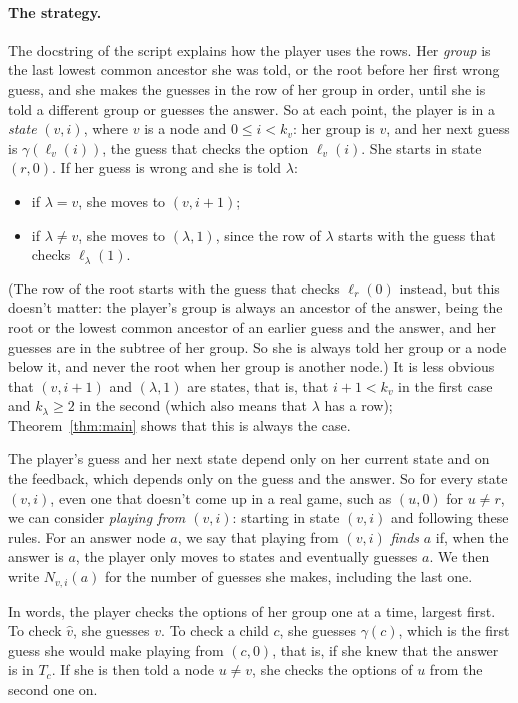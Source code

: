 \documentclass[11pt]{article}
\begin{document}
\paragraph{The strategy.}
The docstring of the script explains how the player uses the rows. Her
\emph{group} is the last lowest common ancestor she was told, or the root before
her first wrong guess, and she makes the guesses in the row of her group in
order, until she is told a different group or guesses the answer. So at each
point, the player is in a \emph{state} $(v, i)$, where $v$ is a node and
$0 \le i < k_v$: her group is $v$, and her next guess is $\gamma(\ell_v(i))$, the
guess that checks the option $\ell_v(i)$. She starts in state $(r, 0)$. If her
guess is wrong and she is told $\lambda$:
\begin{itemize}
  \item if $\lambda = v$, she moves to $(v, i + 1)$;
  \item if $\lambda \ne v$, she moves to $(\lambda, 1)$, since the row of
    $\lambda$ starts with the guess that checks $\ell_\lambda(1)$.
\end{itemize}
(The row of the root starts with the guess that checks $\ell_r(0)$ instead, but
this doesn't matter: the player's group is always an ancestor of the answer,
being the root or the lowest common ancestor of an earlier guess and the answer,
and her guesses are in the subtree of her group. So she is always told her group
or a node below it, and never the root when her group is another node.) It is
less obvious that $(v, i + 1)$ and $(\lambda, 1)$ are states, that is, that
$i + 1 < k_v$ in the first case and $k_\lambda \ge 2$ in the second (which also
means that $\lambda$ has a row); Theorem~\ref{thm:main} shows that this is always
the case.

The player's guess and her next state depend only on her current state and on the
feedback, which depends only on the guess and the answer. So for every state
$(v, i)$, even one that doesn't come up in a real game, such as $(u, 0)$ for
$u \ne r$, we can consider \emph{playing from $(v, i)$}: starting in state
$(v, i)$ and following these rules. For an answer node $a$, we say that playing
from $(v, i)$ \emph{finds} $a$ if, when the answer is $a$, the player only moves
to states and eventually guesses $a$. We then write $N_{v,i}(a)$ for the number of
guesses she makes, including the last one.

In words, the player checks the options of her group one at a time, largest
first. To check $\hat v$, she guesses $v$. To check a child $c$, she guesses
$\gamma(c)$, which is the first guess she would make playing from $(c, 0)$, that
is, if she knew that the answer is in $T_c$. If she is then told a node
$u \ne v$, she checks the options of $u$ from the second one on.
\end{document}
